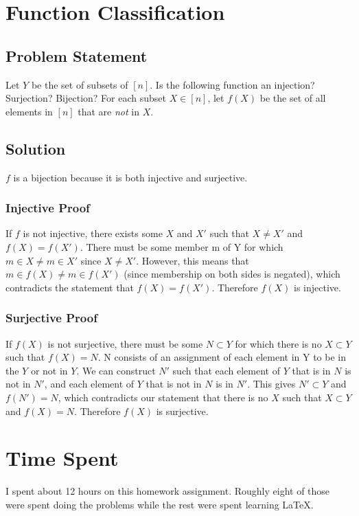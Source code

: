 \documentclass[12pt]{article}
\begin{document}
\section{Function Classification}
\subsection*{Problem Statement}
Let $Y$ be the set of subsets of $[n]$. Is the following function an injection? Surjection? Bijection? For each subset $X \in [n]$, let $f(X)$ be the set of all elements in $[n]$ that are \emph{not} in $X$.
\subsection*{Solution}

$f$ is a bijection because it is both injective and surjective. 
\subsubsection*{Injective Proof}

If $f$ is not injective, there exists some $X$ and $X'$ such that $X \neq X'$ and $f(X) = f(X')$. There must be some member m of Y for which $m \in X \neq m \in X'$ since $X \neq X'$. However, this means that $m \in f(X) \neq m \in f(X')$ (since membership on both sides is negated), which contradicts the statement that $f(X) = f(X')$. Therefore $f(X)$ is injective.

\subsubsection*{Surjective Proof}
If $f(X)$ is not surjective, there must be some $N \subset Y$ for which there is no $X \subset Y$ such that $f(X) = N$.
N consists of an assignment of each element in Y to be in the $Y$ or not in $Y$. We can construct $N'$ such that each element of $Y$ that is in $N$ is not in $N'$, and each element of $Y$ that is not in $N$ is in $N'$. This gives $N' \subset Y$ and $f(N') = N$, which contradicts our statement that there is no $X$ such that $X \subset Y$ and $f(X) = N$. Therefore $f(X)$ is surjective.


\section{Time Spent}
I spent about 12 hours on this homework assignment. Roughly eight of those were spent doing the problems while the rest were spent learning \LaTeX.
\end{document}
